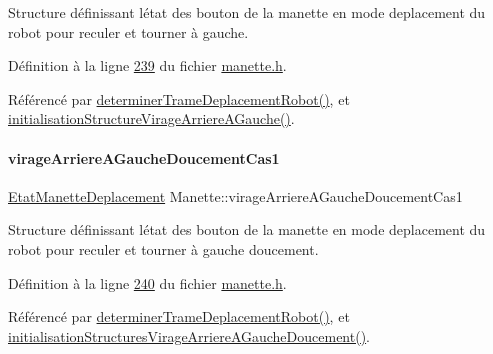 Structure définissant l\textquotesingle{}état des bouton de la manette en mode deplacement du robot pour reculer et tourner à gauche. 



Définition à la ligne \hyperlink{manette_8h_source_l00239}{239} du fichier \hyperlink{manette_8h_source}{manette.\+h}.



Référencé par \hyperlink{manette_8cpp_source_l00341}{determiner\+Trame\+Deplacement\+Robot()}, et \hyperlink{manette_8cpp_source_l00259}{initialisation\+Structure\+Virage\+Arriere\+A\+Gauche()}.

\mbox{\label{class_manette_a984a465aac5dda20091f561339dd351d}} 
\paragraph{\texorpdfstring{virage\+Arriere\+A\+Gauche\+Doucement\+Cas1}{virageArriereAGaucheDoucementCas1}}
{\footnotesize\ttfamily \hyperlink{struct_etat_manette_deplacement}{Etat\+Manette\+Deplacement} Manette\+::virage\+Arriere\+A\+Gauche\+Doucement\+Cas1\hspace{0.3cm}{\ttfamily [private]}}



Structure définissant l\textquotesingle{}état des bouton de la manette en mode deplacement du robot pour reculer et tourner à gauche doucement. 



Définition à la ligne \hyperlink{manette_8h_source_l00240}{240} du fichier \hyperlink{manette_8h_source}{manette.\+h}.



Référencé par \hyperlink{manette_8cpp_source_l00341}{determiner\+Trame\+Deplacement\+Robot()}, et \hyperlink{manette_8cpp_source_l00269}{initialisation\+Structures\+Virage\+Arriere\+A\+Gauche\+Doucement()}.

\mbox{\label{class_manette_ac509477cff14d1ab9562c03e9db833f8}} 
